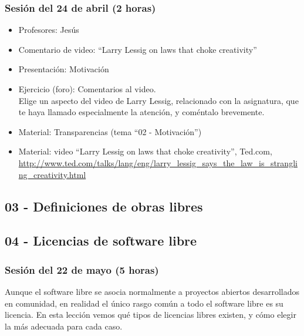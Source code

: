 \documentclass[a4paper,12pt]{article}
\begin{document}
\subsubsection{Sesión del 24 de abril (2 horas)}

 \begin{itemize}
 \item Profesores: Jesús
 \item Comentario de video: ``Larry Lessig on laws that choke creativity''
 \item Presentación: Motivación
 \item Ejercicio (foro): Comentarios al video. \\
   Elige un aspecto del video de Larry Lessig, relacionado con la asignatura, que te haya llamado especialmente la atención, y coméntalo brevemente.
 \item Material: Transparencias (tema ``02 - Motivación'')
 \item Material: video ``Larry Lessig on laws that choke creativity'', Ted.com, \\
   \url{http://www.ted.com/talks/lang/eng/larry_lessig_says_the_law_is_strangling_creativity.html}
 \end{itemize}

\subsection{03 - Definiciones de obras libres}

\subsection{04 - Licencias de software libre}

\subsubsection{Sesión del 22 de mayo (5 horas)}

Aunque el software libre se asocia normalmente a proyectos abiertos desarrollados en comunidad, en realidad el único rasgo común a todo el software libre es su licencia. En esta lección vemos qué tipos de licencias libres existen, y cómo elegir la más adecuada para cada caso. 
\end{document}
